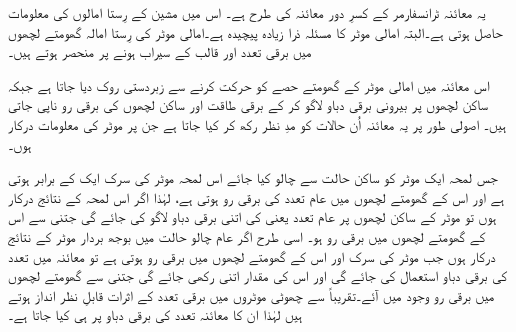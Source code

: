یہ معائنہ ٹرانسفارمر کے کسرِ دور معائنہ کی طرح ہے۔ اس میں مشین کے رِستا امالوں کی معلومات حاصل ہوتی ہے۔البتہ امالی موٹر کا مسئلہ ذرا زیادہ پیچیدہ ہے۔امالی موٹر کی رِستا امالہ گھومتے لچھوں میں برقی تعدد اور قالب کے سیراب ہونے پر منحصر ہوتے ہیں۔

 اس معائنہ میں امالی موٹر کے گھومتے حصے کو حرکت کرنے سے زبردستی روک دیا جاتا ہے جبکہ ساکن لچھوں پر بیرونی برقی دباو  لاگو کر کے برقی طاقت  اور ساکن لچھوں کی برقی رو  ناپی جاتی ہیں۔ اصولی طور پر یہ معائنہ اُن حالات کو مدِ نظر رکھ کر کیا جاتا ہے جن پر موٹر کی معلومات درکار ہوں۔

جس لمحہ ایک موٹر کو ساکن حالت سے چالو کیا جائے اس لمحہ موٹر کی سرک ایک کے برابر ہوتی ہے اور اس کے گھومتے لچھوں میں عام تعدد   کی برقی رو  ہوتی ہے، لہٰذا اگر اس لمحہ کے نتائج درکار ہوں تو موٹر کے ساکن لچھوں پر عام تعدد یعنی   کی اتنی برقی دباو لاگو کی جائے گی جتنی سے اس کے گھومتے لچھوں میں برقی رو  ہو۔ اسی طرح اگر عام چالو حالت میں بوجھ بردار موٹر کے نتائج درکار ہوں جب موٹر کی سرک  اور اس کے گھومتے لچھوں میں برقی رو  ہوتی ہے تو معائنہ میں  تعدد کی برقی دباو استعمال کی جائے گی اور اس کی مقدار اتنی رکھی جائے گی جتنی سے گھومتے لچھوں میں  برقی رو وجود میں آئے۔تقریباً   سے چھوٹی موٹروں میں برقی تعدد کے اثرات قابلِ نظر انداز ہوتے ہیں لہٰذا ان کا معائنہ  تعدد کی برقی دباو پر ہی کیا جاتا ہے۔

